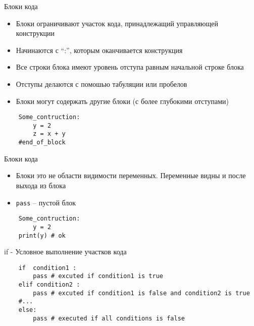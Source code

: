 \documentclass{article}
\begin{document}
\LARGE

\begin{center} Блоки кода \end{center}
\begin{itemize}
	\item Блоки ограничивают участок кода, принадлежащий управляющей конструкции
	\item Начинаются с “:”, которым оканчивается конструкция
	\item Все строки блока имеют уровень отступа равным начальной строке блока
	\item Отступы делаются с помошью табуляции или пробелов
	\item Блоки могут содержать другие блоки (с более глубокими отступами)
\end{itemize}
\vspace{15pt}
\begin{lstlisting}
	Some_contruction:
		y = 2
		z = x + y
	#end_of_block
\end{lstlisting}
\newpage

\begin{center} Блоки кода \end{center}
\begin{itemize}
	\item Блоки это не области видимости переменных. Переменные видны и после выхода из блока
	\item \lstinline$pass$ – пустой блок
\end{itemize}
\vspace{15pt}
\begin{lstlisting}
	Some_contruction:
		y = 2
	print(y) # ok
\end{lstlisting}
\newpage

\begin{center} if - Условное выполнение участков кода \end{center}
\vspace{15pt}
\begin{lstlisting}
	if  condition1 :
	    pass # excuted if condition1 is true
	elif condition2 :
	    pass # excuted if condition1 is false and condition2 is true
	#...
	else:
	    pass # executed if all conditions is false
\end{lstlisting}
\newpage
\end{document}
